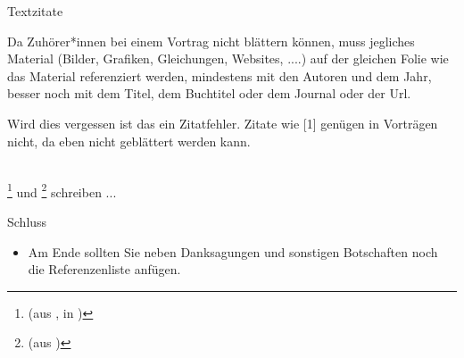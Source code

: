 \documentclass[aspectratio=169]{beamer}
\begin{document}
\begin{frame}{Textzitate}{ }


Da Zuh\"{o}rer*innen bei einem Vortrag nicht bl\"{a}ttern k\"{o}nnen, muss jegliches Material (Bilder, Grafiken, Gleichungen, Websites, ....) auf der gleichen Folie wie das Material referenziert werden, mindestens mit den Autoren und dem Jahr, besser noch mit dem Titel, dem Buchtitel oder dem Journal oder der Url.

Wird dies vergessen ist das ein Zitatfehler. Zitate wie [1] gen\"{u}gen in Vortr\"{a}gen nicht, da eben nicht gebl\"{a}ttert werden kann.

${}$\\

\citeauthor{Schoedel2002}\footnote{(aus \cite{Schoedel2002},  in )} und \citeauthor{Das2003}\footnote{(aus \cite{Das2003} )} schreiben ...

\end{frame}

\begin{frame}{Schluss}{ }


    \begin{itemize}
    
    \item Am Ende sollten Sie neben Danksagungen und sonstigen Botschaften noch die Referenzenliste anf\"{u}gen.
    
    \end{itemize}



\end{frame}
\end{document}
